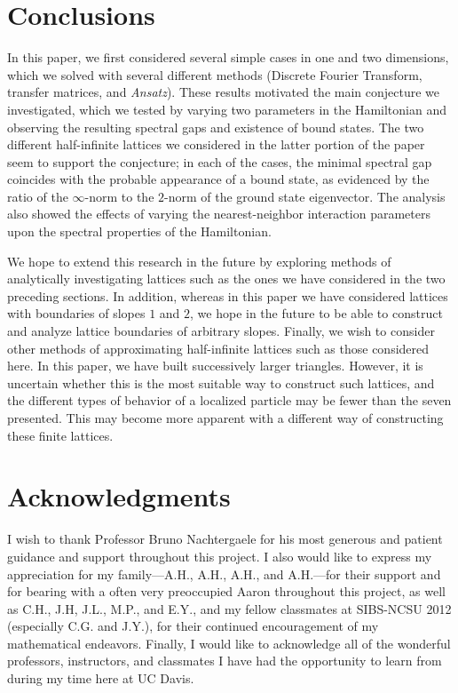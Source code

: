 \documentclass{article}
\numberwithin{equation}{section}
\numberwithin{theorem}{section}
\numberwithin{proposition}{section}
\numberwithin{lemma}{section}
\numberwithin{corollary}{section}
\numberwithin{definition}{section}
\begin{document}
\section{Conclusions}

In this paper, we first considered several simple cases in one and two dimensions, which we solved with several different methods (Discrete Fourier Transform, transfer matrices, and \textit{Ansatz}). These results motivated the main conjecture we investigated, which we tested by varying two parameters in the Hamiltonian and observing the resulting spectral gaps and existence of bound states. The two different half-infinite lattices we considered in the latter portion of the paper seem to support the conjecture; in each of the cases, the minimal spectral gap coincides with the probable appearance of a bound state, as evidenced by the ratio of the $\infty$-norm to the $2$-norm of the ground state eigenvector. The analysis also showed the effects of varying the nearest-neighbor interaction parameters upon the spectral properties of the Hamiltonian.

We hope to extend this research in the future by exploring methods of analytically investigating lattices such as the ones we have considered in the two preceding sections. In addition, whereas in this paper we have considered lattices with boundaries of slopes $1$ and $2$, we hope in the future to be able to construct and analyze lattice boundaries of arbitrary slopes. Finally, we wish to consider other methods of approximating half-infinite lattices such as those considered here. In this paper, we have built successively larger triangles. However, it is uncertain whether this is the most suitable way to construct such lattices, and the different types of behavior of a localized particle may be fewer than the seven presented. This may become more apparent with a different way of constructing these finite lattices.

\section*{Acknowledgments}

I wish to thank Professor Bruno Nachtergaele for his most generous and patient guidance and support throughout this project. I also would like to express my appreciation for my family---A.H., A.H., A.H., and A.H.---for their support and for bearing with a often very preoccupied Aaron throughout this project, as well as C.H., J.H, J.L., M.P., and E.Y., and my fellow classmates at SIBS-NCSU 2012 (especially C.G. and J.Y.), for their continued encouragement of my mathematical endeavors. Finally, I would like to acknowledge all of the wonderful professors, instructors, and classmates I have had the opportunity to learn from during my time here at UC Davis.
\end{document}
